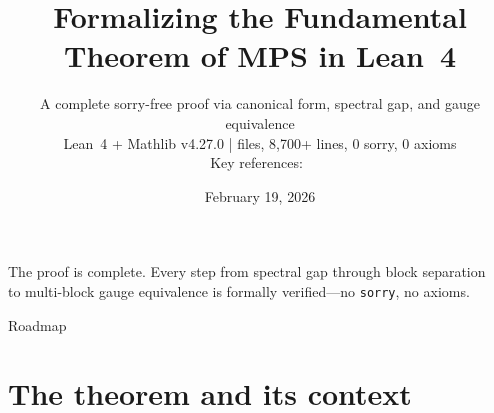 \documentclass[aspectratio=169,10pt]{beamer}
\title{Formalizing the Fundamental Theorem of MPS in Lean~4}
\subtitle{A complete sorry-free proof via canonical form, spectral gap, and gauge equivalence\\
{\scriptsize Lean~4 + Mathlib v4.27.0 \quad|\quad 48 files, 8{,}700+ lines, 0 sorry, 0 axioms\\
Key references:~\cite{Perez-Garcia2007Matrix,Cirac2021Matrix,Cirac2017Annals,Wolf2012Quantum}}}
\date{February 19, 2026}
\author{}
\begin{document}
{%
\begin{frame}
    \vspace{-1.5em}
    \maketitle
    \vspace{-2.0em}
    \begin{center}
        {\footnotesize\textcolor{leangreen}{%
                The proof is complete. Every step from spectral gap through block separation\\
                to multi-block gauge equivalence is formally verified---no \texttt{sorry}, no axioms.}}
    \end{center}
\end{frame}
}

\begin{frame}{Roadmap}
    \vspace{-0.4em}
    \tableofcontents
\end{frame}

\section{The theorem and its context}
\end{document}
